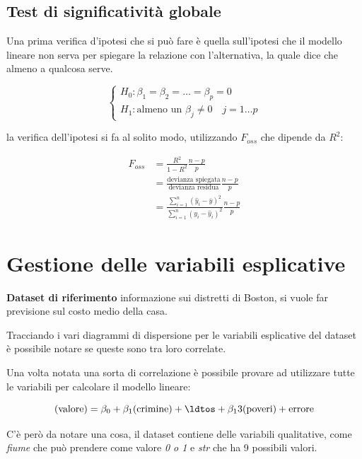 \subsection{Test di significatività globale}

Una prima verifica d'ipotesi che si può fare è quella sull'ipotesi che il modello lineare non serva per spiegare la relazione con l'alternativa, la quale dice che almeno a qualcosa serve.

$$
\begin{cases}
H_0 : \beta_1 = \beta_2 = \ldots = \beta_p = 0 \\
H_1 : \text{almeno un }\beta_j \neq 0 \quad j = 1 \ldots p
\end{cases}
$$

la verifica dell'ipotesi si fa al solito modo, utilizzando $ F_{oss} $ che dipende da $ R^2 $:

\begin{align*}
F_{oss} &= \frac{R^2}{1-R^2} \frac{n - p}{p} \\
			 &= \frac{\text{devianza spiegata}}{\text{devianza residua}} \frac{n - p}{p} \\
			 &= \frac{\sum_{i=1}^{n} (\hat{y}_i - \bar{y})^2}{\sum_{i=1}^{n} (y_i - \hat{y}_i)^2} \frac{n - p}{p}
\end{align*}


\section{Gestione delle variabili esplicative}

\textbf{Dataset di riferimento} informazione sui distretti di Boston, si vuole far previsione sul costo medio della casa.

Tracciando i vari diagrammi di dispersione per le variabili esplicative del dataset è possibile notare se queste sono tra loro correlate.

Una volta notata una sorta di correlazione è possibile provare ad utilizzare tutte le variabili per calcolare il modello lineare:

$$
\text{(valore)} = \beta_0 + \beta_1 \text{(crimine)} + \ldtos + \beta_13 \text{(poveri)} + \text{errore}
$$

C'è però da notare una cosa, il dataset contiene delle variabili qualitative, come \textit{fiume} che può prendere come valore \textit{0 o 1} e \textit{str} che ha 9 possibili valori.

